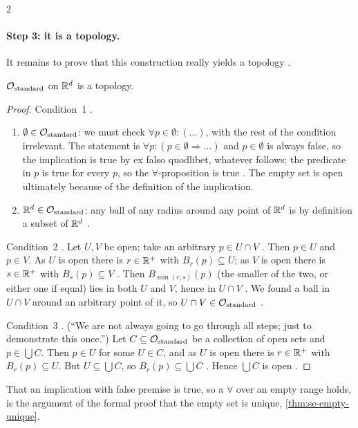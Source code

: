 \begin{paracol}{2}
\paragraph{Step 3: it is a topology.} It remains to prove that this construction really yields a topology
.
\begin{proposition}\label{prop:to-standard}
$\mathcal O_{\rm standard}$ on $\mathbb{R}^d$ is a topology.
\end{proposition}
\begin{proof}
Condition~1 .
\begin{enumerate}
  \item $\emptyset\in\mathcal O_{\rm standard}$: we must check $\forall p\in\emptyset\colon(\dots)$, with the rest of the
        condition irrelevant. The statement is $\forall p\colon (p\in\emptyset\Rightarrow\dots)$ and $p\in\emptyset$ is always
        false, so the implication is true by ex falso quodlibet, whatever follows; the predicate in $p$ is true for every
        $p$, so the $\forall$-proposition is true . The empty set is open
        ultimately because of the definition of the implication.
  \item $\mathbb{R}^d\in\mathcal O_{\rm standard}$: any ball of any radius around any point of $\mathbb{R}^d$ is by definition a subset of
        $\mathbb{R}^d$ .
\end{enumerate}
Condition~2 . Let $U,V$ be open; take an arbitrary $p\in U\cap V$ . Then $p\in U$
and $p\in V$. As $U$ is open there is $r\in\mathbb{R}^+$ with $B_r(p)\subseteq U$; as $V$ is open there is $s\in\mathbb{R}^+$ with
$B_s(p)\subseteq V$ . Then $B_{\min(r,s)}(p)$ (the smaller of the two, or either one if equal)
lies in both $U$ and $V$, hence in $U\cap V$ . We found a ball in $U\cap V$ around an arbitrary
point of it, so $U\cap V\in\mathcal O_{\rm standard}$ .

Condition~3 . (``We are not always going to go through all steps; just to demonstrate this once.'')
Let $C\subseteq\mathcal O_{\rm standard}$ be a collection of open sets and $p\in\bigcup C$. Then $p\in U$ for some $U\in C$,
and as $U$ is open there is $r\in\mathbb{R}^+$ with $B_r(p)\subseteq U$. But $U\subseteq\bigcup C$, so $B_r(p)\subseteq\bigcup C$
. Hence $\bigcup C$ is open .
\end{proof}
\begin{recall}
That an implication with false premise is true, so a $\forall$ over an empty range holds, is the argument of the
formal proof that the empty set is unique, \cref{thm:se-empty-unique}.
\end{recall}


\end{paracol}
